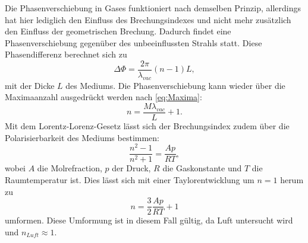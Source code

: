 Die Phasenverschiebung in Gases funktioniert nach demselben Prinzip, allerdings hat hier lediglich den Einfluss des Brechungsindexes und nicht mehr zusätzlich
den Einfluss der geometrischen Brechung.
Dadurch findet eine Phasenverschiebung gegenüber des unbeeinflussten Strahls statt. Diese Phasendifferenz berechnet sich zu 
\begin{equation}
    \Delta \Phi = \frac{2\pi}{\lambda_{vac}}(n-1)L,
\end{equation}
mit der Dicke $L$ des Mediums. Die Phasenverschiebung kann wieder über die Maximaanzahl ausgedrückt werden nach \autoref{eq:Maxima}:
\begin{equation}
    \label{eqn:luft}
    n = \frac{M \lambda_{vac}}{L} + 1.
\end{equation}
Mit dem Lorentz-Lorenz-Gesetz lässt sich der Brechungsindex zudem über die Polarisierbarkeit des Mediums bestimmen:
\begin{equation}
    \frac{n^2-1}{n^2+1} = \frac{A p}{R T},
\end{equation}
wobei $A$ die Molrefraction, $p$ der Druck, $R$ die Gaskonstante und $T$ die Raumtemperatur ist. Dies lässt sich mit einer Taylorentwicklung 
um $n=1$ herum zu 
\begin{equation}
    \label{eqn:lorentz}
    n = \frac{3}{2} \frac{A p}{R T} + 1
\end{equation}
umformen. Diese Umformung ist in diesem Fall gültig, da Luft untersucht wird und $n_{Luft} \approx 1$.

